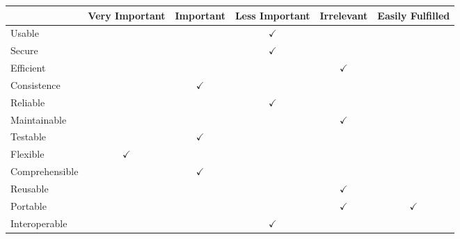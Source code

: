 \begin{figure}[h]
	\centering
		\begin{tabular}{| l | m{} | m{}| m{}| m{}|m{}|} \hline
												& Very  Important 												& Important 														& Less Important 											& Irrelevant 												& Easily Fulfilled 									\\ \hline
		Usable  						& 																				& 												& \multicolumn{1}{c|}{$\checkmark$}		& 																	& 																	\\ \hline
		Secure  						& 																				& 																			& \multicolumn{1}{c|}{$\checkmark$} 	& 																	& 																	\\ \hline
		Efficient 					& 																				& 																			& 																		& \multicolumn{1}{c|}{$\checkmark$} & 																	\\ \hline
		Consistence  				& 																				& \multicolumn{1}{c|}{$\checkmark$} 		& 																		& 																	& 																	\\ \hline
		Reliable  					& 																				& 																			& \multicolumn{1}{c|}{$\checkmark$} 	& 																	& 																	\\ \hline
		Maintainable  			& 																				& 																			& 																		& \multicolumn{1}{c|}{$\checkmark$} & 																	\\ \hline
		Testable  					& 																				& \multicolumn{1}{c|}{$\checkmark$} 		& 																		& 																	& 																	\\ \hline
		Flexible  					& \multicolumn{1}{c|}{$\checkmark$} 			& 																			& 																		& 																	& 																	\\ \hline
		Comprehensible  		& 																				& \multicolumn{1}{c|}{$\checkmark$} 		& 																		& 																	& 																	\\ \hline
		Reusable  					& 																				& 																			& 																		& \multicolumn{1}{c|}{$\checkmark$} & 																	\\ \hline
		Portable 						& 																				& 																			& 																		& \multicolumn{1}{c|}{$\checkmark$} &	\multicolumn{1}{c|}{$\checkmark$} \\ \hline
		Interoperable 			& 																				& 																			& \multicolumn{1}{c|}{$\checkmark$} 	& 																	& 																	\\ \hline
		\end{tabular}
	\label{fig:prioritizedCrit}
\end{figure}


